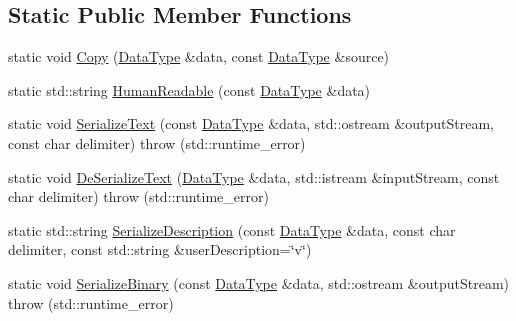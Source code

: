 \subsection*{Static Public Member Functions}
\begin{DoxyCompactItemize}
\item 
static void \hyperlink{classcmn_data_3_01std_1_1vector_3_01__element_type_01_4_01_4_ae453c8bec96e236e157e30ef793f1deb}{Copy} (\hyperlink{classcmn_data_3_01std_1_1vector_3_01__element_type_01_4_01_4_a7a5332ebd12138b5f6d8b856cd3fdfd5}{Data\+Type} \&data, const \hyperlink{classcmn_data_3_01std_1_1vector_3_01__element_type_01_4_01_4_a7a5332ebd12138b5f6d8b856cd3fdfd5}{Data\+Type} \&source)
\item 
static std\+::string \hyperlink{classcmn_data_3_01std_1_1vector_3_01__element_type_01_4_01_4_a49bc774aae496bf06bc80f767e9a0df4}{Human\+Readable} (const \hyperlink{classcmn_data_3_01std_1_1vector_3_01__element_type_01_4_01_4_a7a5332ebd12138b5f6d8b856cd3fdfd5}{Data\+Type} \&data)
\item 
static void \hyperlink{classcmn_data_3_01std_1_1vector_3_01__element_type_01_4_01_4_a3b28193010a0e63d42323a83ed005aac}{Serialize\+Text} (const \hyperlink{classcmn_data_3_01std_1_1vector_3_01__element_type_01_4_01_4_a7a5332ebd12138b5f6d8b856cd3fdfd5}{Data\+Type} \&data, std\+::ostream \&output\+Stream, const char delimiter)  throw (std\+::runtime\+\_\+error)
\item 
static void \hyperlink{classcmn_data_3_01std_1_1vector_3_01__element_type_01_4_01_4_a1430b1ded7b53e4bd1cc979fab5d7fb1}{De\+Serialize\+Text} (\hyperlink{classcmn_data_3_01std_1_1vector_3_01__element_type_01_4_01_4_a7a5332ebd12138b5f6d8b856cd3fdfd5}{Data\+Type} \&data, std\+::istream \&input\+Stream, const char delimiter)  throw (std\+::runtime\+\_\+error)
\item 
static std\+::string \hyperlink{classcmn_data_3_01std_1_1vector_3_01__element_type_01_4_01_4_acf70f891b565c1cf72d0490f1d867359}{Serialize\+Description} (const \hyperlink{classcmn_data_3_01std_1_1vector_3_01__element_type_01_4_01_4_a7a5332ebd12138b5f6d8b856cd3fdfd5}{Data\+Type} \&data, const char delimiter, const std\+::string \&user\+Description=\char`\"{}v\char`\"{})
\item 
static void \hyperlink{classcmn_data_3_01std_1_1vector_3_01__element_type_01_4_01_4_a7760738008950d2ed8fa00bafb1190f8}{Serialize\+Binary} (const \hyperlink{classcmn_data_3_01std_1_1vector_3_01__element_type_01_4_01_4_a7a5332ebd12138b5f6d8b856cd3fdfd5}{Data\+Type} \&data, std\+::ostream \&output\+Stream)  throw (std\+::runtime\+\_\+error)

\end{DoxyCompactItemize}
